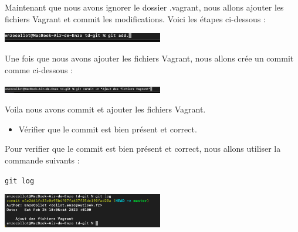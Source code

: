 \documentclass[12pt]{article}
\begin{document}
\vspace{0.3cm}

Maintenant que nous avons ignorer le dossier .vagrant, nous allons ajouter les fichiers Vagrant et commit les modifications. Voici les étapes ci-dessous : 

\vspace{0.3cm}

\begin{center}
  \includegraphics[width=7cm]{Image-TD-Git-1/git add.png}
\end{center}

Une fois que nous avons ajouter les fichiers Vagrant, nous allons crée un commit comme ci-dessous : 

\vspace{0.3cm}

\begin{center}
  \includegraphics[width=7cm]{Image-TD-Git-1/git commit.png}
\end{center}

\vspace{0.3cm}

Voila nous avons commit et ajouter les fichiers Vagrant.

\vspace{0.3cm}

\begin{itemize}
  \item Vérifier que le commit est bien présent et correct.
\end{itemize}

\vspace{0.3cm}

Pour verifier que le commit est bien présent et correct, nous allons utiliser la commande suivants : 

\texttt{git log}

\vspace{0.3cm}

\begin{center}
  \includegraphics[width=7cm]{Image-TD-Git-1/git-log.png}
\end{center}
\end{document}
